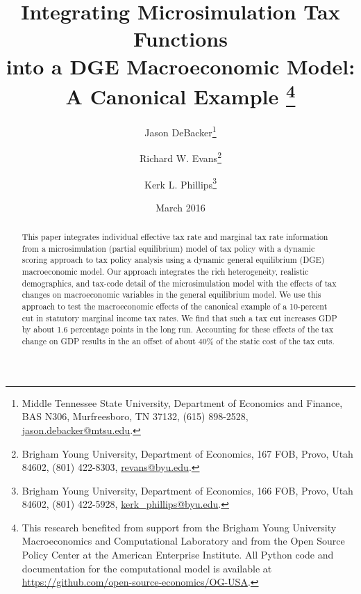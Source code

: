 \documentclass[letterpaper,12pt]{article}
\theoremstyle{definition}
\begin{document}
\begin{titlepage}
\title{Integrating Microsimulation Tax Functions \\ into a DGE Macroeconomic Model: \\ A Canonical Example \thanks{This research benefited from support from the Brigham Young University Macroeconomics and Computational Laboratory and from the Open Source Policy Center at the American Enterprise Institute. All Python code and documentation for the computational model is available at \href{https://github.com/open-source-economics/OG-USA}{https://github.com/open-source-economics/OG-USA}.}
       }
       \author{
  Jason DeBacker\footnote{Middle Tennessee State University, Department of Economics and Finance, BAS N306, Murfreesboro, TN 37132, (615) 898-2528, \href{mailto:jason.debacker@mtsu.edu}{jason.debacker@mtsu.edu}.} \\[-2pt]
  \and
  Richard W. Evans\footnote{Brigham Young University, Department of Economics, 167 FOB, Provo, Utah 84602, (801) 422-8303, \href{mailto:revans@byu.edu}{revans@byu.edu}.} \\[-2pt]
  \and
  Kerk L. Phillips\footnote{Brigham Young University, Department of Economics, 166 FOB, Provo, Utah 84602, (801) 422-5928, \href{mailto:kerk_phillips@byu.edu}{kerk\_phillips@byu.edu}.}}
\date{March 2016}
\maketitle
\vspace{-9mm}
\begin{abstract}
\small{This paper integrates individual effective tax rate and marginal tax rate information from a microsimulation (partial equilibrium) model of tax policy with a dynamic scoring approach to tax policy analysis using a dynamic general equilibrium (DGE) macroeconomic model. Our approach integrates the rich heterogeneity, realistic demographics, and tax-code detail of the microsimulation model with the effects of tax changes on macroeconomic variables in the general equilibrium model. We use this approach to test the macroeconomic effects of the canonical example of a 10-percent cut in statutory marginal income tax rates. We find that such a tax cut increases GDP by about 1.6 percentage points in the long run.  Accounting for these effects of the tax change on GDP results in the an offset of about 40\% of the static cost of the tax cuts.
\vspace{3mm}

%
%
}

\end{abstract}
\thispagestyle{empty}
\end{titlepage}
\end{document}
